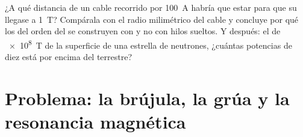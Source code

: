 \begin{exercise}[$\star\star\star$]\label{exo:g11:magnetic-fields:15}
¿A qué distancia de un cable recorrido por \qty{100}{A} habría que estar
para que su  llegase a \qty{1}{T}? Compárala con el radio
milimétrico del cable y concluye por qué los  del orden del 
se construyen con  y no con hilos sueltos. Y después: el 
de \qty{e8}{T} de la superficie de una estrella de neutrones, ¿cuántas
potencias de diez está por encima del terrestre?
\end{exercise}

\section{Problema: la brújula, la grúa y la resonancia magnética}

